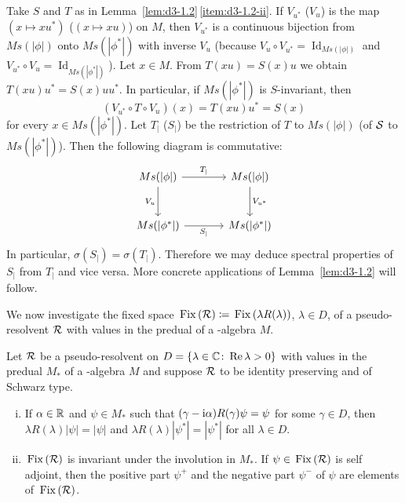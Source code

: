 \begin{remark}\label{rem:d3-1.3}
Take $S$ and $T$ as in Lemma~\ref{lem:d3-1.2}\,\ref{item:d3-1.2-ii}.
If $V_{u^{*}}$ (\resp  $V_u$) is the map $(x \mapsto xu^{*})$ (\resp  $(x \mapsto xu)$) on $M$, then $V_{u^{*}}$ is a continuous bijection from $Ms(|\phi|)$ onto $Ms(|\phi^{*}|)$ with inverse $V_u$ (because $V_u \circ V_{u^{*}} = \operatorname{Id}_{Ms(|\phi|)}$ and $V_{u^{*}} \circ V_u = \operatorname{Id}_{Ms(|\phi^{*}|)}$).
Let $x \in M$.
From $T(xu) = S(x)u$ we obtain $T(xu)u^{*} = S(x)uu^{*}$.
In particular, if $Ms(|\phi^{*}|)$ is $S$-invariant, then
\[
	(V_{u^{*}} \circ T \circ V_u)(x) = T(xu)u^{*} = S(x)
\]
for every $x \in Ms(|\phi^{*}|)$.
Let $T_{|}$ (\resp  $S_{|}$) be the restriction of $T$ to $Ms(|\phi|)$ (\resp of $\mathcal{S}$ to $Ms(|\phi^{*}|)$).
Then the following diagram is commutative:
\begin{equation*}
\begin{tikzcd}[column sep=large, row sep=large, scale=1.5]
Ms(|\phi|) \arrow[r, "T_{|}"] \arrow[d, "V_u"'] & Ms(|\phi|) \arrow[d, "V_{u^{*}}"] \\
Ms(|\phi^{*}|) \arrow[r, "S_{|}"'] & Ms(|\phi^{*}|)
\end{tikzcd}
\end{equation*}
In particular, $\sigma(S_{|}) = \sigma(T_{|})$.
Therefore we may deduce spectral properties of $S_{|}$ from $T_{|}$ and vice versa.
More concrete applications of Lemma~\ref{lem:d3-1.2} will follow.
\end{remark}
We now investigate the fixed space $\mathop{}\mathrm{Fix}\left(\mathcal{R}\right) \coloneqq \mathop{}\mathrm{Fix}\left(\lambda R(\lambda)\right)$, $\lambda \in D$, of a pseudo-resolvent $\mathcal{R}$ with values in the predual of a \WA-algebra $M$.
\begin{proposition}\label{prop:d3-1.4}
Let $\mathcal{R}$ be a pseudo-resolvent on $D = \{\lambda \in \mathbb{C} \colon \mathop{}\!\mathrm{Re}\,\lambda > 0\}$ with values in the predual $M_{*}$ of a \WA-algebra $M$ and suppose $\mathcal{R}$ to be identity preserving and of Schwarz type.
\begin{enumerate}[(i)]

\item\label{item:d3-1.4-i}
If $\alpha \in \mathbb{R}$ and $\psi \in M_{*}$ such that $(\gamma - \mathrm{i}\alpha)R(\gamma)\psi = \psi$ for some $\gamma \in D$, then $\lambda R(\lambda)|\psi| = |\psi|$ and $\lambda R(\lambda)|\psi^{*}| = |\psi^{*}|$ for all $\lambda \in D$.

\item\label{item:d3-1.4-ii} 
$ \mathop{}\mathrm{Fix}\left(\mathcal{R}\right) $ is invariant under the involution in $M_{*}$.
If $\psi \in \mathop{}\mathrm{Fix}\left(\mathcal{R}\right) $ is self adjoint, then the positive part $\psi^{+}$ and the negative part $\psi^{-}$ of $\psi$ are elements of $ \mathop{}\mathrm{Fix}\left(\mathcal{R}\right) $.
\end{enumerate}
\end{proposition}

